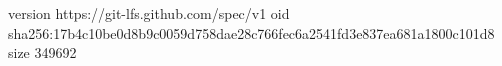version https://git-lfs.github.com/spec/v1
oid sha256:17b4c10be0d8b9c0059d758dae28c766fec6a2541fd3e837ea681a1800c101d8
size 349692
